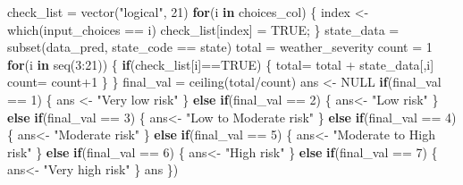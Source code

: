 \documentclass[
]{article}
\newenvironment{Shaded}{\begin{snugshade}}{\end{snugshade}}
\newcommand{\ConstantTok}[1]{\textcolor[rgb]{0.00,0.00,0.00}{#1}}
\newcommand{\ControlFlowTok}[1]{\textcolor[rgb]{0.13,0.29,0.53}{\textbf{#1}}}
\newcommand{\DecValTok}[1]{\textcolor[rgb]{0.00,0.00,0.81}{#1}}
\newcommand{\FunctionTok}[1]{\textcolor[rgb]{0.00,0.00,0.00}{#1}}
\newcommand{\NormalTok}[1]{#1}
\newcommand{\OtherTok}[1]{\textcolor[rgb]{0.56,0.35,0.01}{#1}}
\newcommand{\SpecialCharTok}[1]{\textcolor[rgb]{0.00,0.00,0.00}{#1}}
\newcommand{\StringTok}[1]{\textcolor[rgb]{0.31,0.60,0.02}{#1}}
\begin{document}
\begin{Shaded}
\begin{Highlighting}[]
\NormalTok{    check\_list }\OtherTok{=} \FunctionTok{vector}\NormalTok{(}\StringTok{"logical"}\NormalTok{, }\DecValTok{21}\NormalTok{)}
    \ControlFlowTok{for}\NormalTok{(i }\ControlFlowTok{in}\NormalTok{ choices\_col) \{}
\NormalTok{      index }\OtherTok{\textless{}{-}} \FunctionTok{which}\NormalTok{(input\_choices }\SpecialCharTok{==}\NormalTok{ i)}
\NormalTok{      check\_list[index] }\OtherTok{=} \ConstantTok{TRUE}\NormalTok{;}
\NormalTok{    \}}
\NormalTok{    state\_data }\OtherTok{=} \FunctionTok{subset}\NormalTok{(data\_pred, state\_code }\SpecialCharTok{==}\NormalTok{ state)}
\NormalTok{    total }\OtherTok{=}\NormalTok{ weather\_severity}
\NormalTok{    count }\OtherTok{=} \DecValTok{1}
    \ControlFlowTok{for}\NormalTok{(i }\ControlFlowTok{in} \FunctionTok{seq}\NormalTok{(}\DecValTok{3}\SpecialCharTok{:}\DecValTok{21}\NormalTok{))}
\NormalTok{    \{}
      \ControlFlowTok{if}\NormalTok{(check\_list[i]}\SpecialCharTok{==}\ConstantTok{TRUE}\NormalTok{)}
\NormalTok{      \{}
\NormalTok{        total}\OtherTok{=}\NormalTok{ total }\SpecialCharTok{+}\NormalTok{ state\_data[,i]}
\NormalTok{        count}\OtherTok{=}\NormalTok{ count}\SpecialCharTok{+}\DecValTok{1}
\NormalTok{      \}}
\NormalTok{    \}}
\NormalTok{    final\_val }\OtherTok{=} \FunctionTok{ceiling}\NormalTok{(total}\SpecialCharTok{/}\NormalTok{count)}
\NormalTok{    ans }\OtherTok{\textless{}{-}} \ConstantTok{NULL}
    \ControlFlowTok{if}\NormalTok{(final\_val }\SpecialCharTok{==} \DecValTok{1}\NormalTok{) \{}
\NormalTok{      ans }\OtherTok{\textless{}{-}} \StringTok{"Very low risk"}
\NormalTok{    \}}
    \ControlFlowTok{else} \ControlFlowTok{if}\NormalTok{(final\_val }\SpecialCharTok{==} \DecValTok{2}\NormalTok{) \{}
\NormalTok{      ans}\OtherTok{\textless{}{-}} \StringTok{"Low risk"}
\NormalTok{    \}}
    \ControlFlowTok{else} \ControlFlowTok{if}\NormalTok{(final\_val }\SpecialCharTok{==} \DecValTok{3}\NormalTok{) \{}
\NormalTok{      ans}\OtherTok{\textless{}{-}} \StringTok{"Low to Moderate risk"}
\NormalTok{    \}}
    \ControlFlowTok{else} \ControlFlowTok{if}\NormalTok{(final\_val }\SpecialCharTok{==} \DecValTok{4}\NormalTok{) \{}
\NormalTok{      ans}\OtherTok{\textless{}{-}} \StringTok{"Moderate risk"}
\NormalTok{    \}}
    \ControlFlowTok{else} \ControlFlowTok{if}\NormalTok{(final\_val }\SpecialCharTok{==} \DecValTok{5}\NormalTok{) \{}
\NormalTok{      ans}\OtherTok{\textless{}{-}} \StringTok{"Moderate to High risk"}
\NormalTok{    \}}
    \ControlFlowTok{else} \ControlFlowTok{if}\NormalTok{(final\_val }\SpecialCharTok{==} \DecValTok{6}\NormalTok{) \{}
\NormalTok{      ans}\OtherTok{\textless{}{-}} \StringTok{"High risk"}
\NormalTok{    \}}
    \ControlFlowTok{else} \ControlFlowTok{if}\NormalTok{(final\_val }\SpecialCharTok{==} \DecValTok{7}\NormalTok{) \{}
\NormalTok{      ans}\OtherTok{\textless{}{-}} \StringTok{"Very high risk"}
\NormalTok{    \}}
\NormalTok{    ans}
\NormalTok{  \})}
  

\end{Highlighting}
\end{Shaded}
\end{document}
